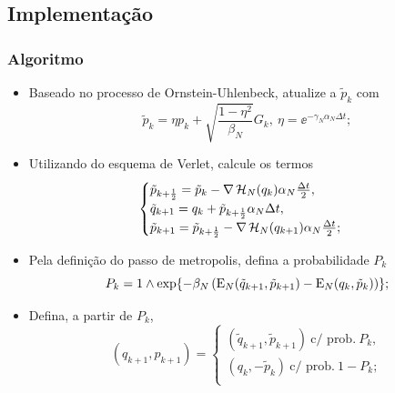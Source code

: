 \subsection{Implementação}
\begin{frame}
	\frametitle{Algoritmo}
	
		\begin{itemize}		
			\item<1> Baseado no processo de Ornstein-Uhlenbeck, atualize a $\tilde{p}_k$ com
			$$
				\tilde{p}_k = \eta p_k + \sqrt{\frac{1-\eta^2}{\beta_N}} G_k, \ \eta = \ee^{-\gamma_N \alpha_N \Delta t};
				\label{Equation: Alg Mehler}
			$$
			\item<2> Utilizando do esquema de Verlet, calcule os termos
			$$
				\begin{cases}
					\tilde{p}_{k+\frac{1}{2}} = \tilde{p}_k - \nabla \operatorname{\mathcal{H}}_N(q_k) \alpha_N \frac{\Delta t}{2}, \\
					\tilde{q}_{k+1} = q_k + \tilde{p}_{k + \frac{1}{2}} \alpha_N \Delta t, \\
					\tilde{p}_{k+1} = \tilde{p}_{k+\frac{1}{2}} - \nabla \operatorname{\mathcal{H}}_N(q_{k+1}) \alpha_N \frac{\Delta t}{2};
					\label{Equation: Alg Verlet}
				\end{cases}
			$$
			\item<3> Pela definição do passo de metropolis, defina a probabilidade $P_k$
			$$
				P_k = 1 \wedge \exp{ -\beta_N \left(\operatorname{E}_N(\tilde{q}_{k+1}, \tilde{p}_{k+1}) - \operatorname{E}_N(q_{k}, \tilde{p}_{k}) \right)};
			$$
			\item<4> Defina, a partir de $P_k$, 
			$$
				(q_{k+1}, p_{k+1}) = 
				\begin{cases}
					(\tilde{q}_{k+1}, \tilde{p}_{k+1}) \ \text{c/ prob.} \ P_k, \\
					(q_k, -\tilde{p}_{k}) \ \text{c/ prob.} \ 1-P_k; \\
				\end{cases}
			$$
		\end{itemize}

\end{frame}

